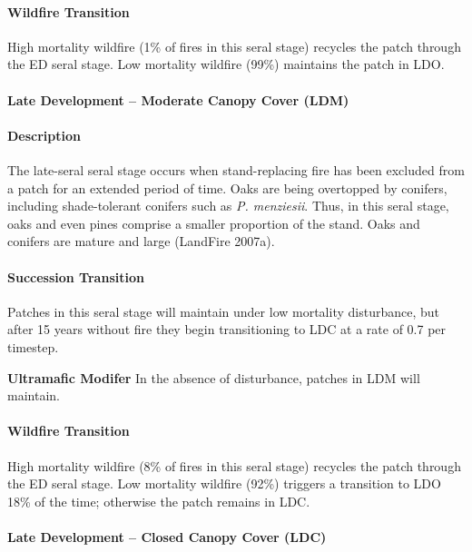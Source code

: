 \paragraph{Wildfire Transition}
High mortality wildfire (1\% of fires in this seral stage) recycles the patch through the ED seral stage. Low mortality wildfire (99\%) maintains the patch in LDO.

\noindent\hrulefill

\paragraph{Late Development – Moderate Canopy Cover (LDM)}

\paragraph{Description} The late-seral seral stage occurs when stand-replacing fire has been excluded from a patch for an extended period of time. Oaks are being overtopped by conifers, including shade-tolerant conifers such as \emph{P. menziesii}. Thus, in this seral stage, oaks and even pines comprise a smaller proportion of the stand. Oaks and conifers are mature and large (LandFire 2007a). 

\paragraph{Succession Transition} Patches in this seral stage will maintain under low mortality disturbance, but after 15 years without fire they begin transitioning to LDC at a rate of 0.7 per timestep.
\begin{adjustwidth}{2cm}{}

\textbf{Ultramafic Modifer}  In the absence of disturbance, patches in LDM will maintain.

\end{adjustwidth}
\paragraph{Wildfire Transition} High mortality wildfire (8\% of fires in this seral stage) recycles the patch through the ED seral stage. Low mortality wildfire (92\%) triggers a transition to LDO 18\% of the time; otherwise the patch remains in LDC.

\noindent\hrulefill

\paragraph{Late Development – Closed Canopy Cover (LDC)}


